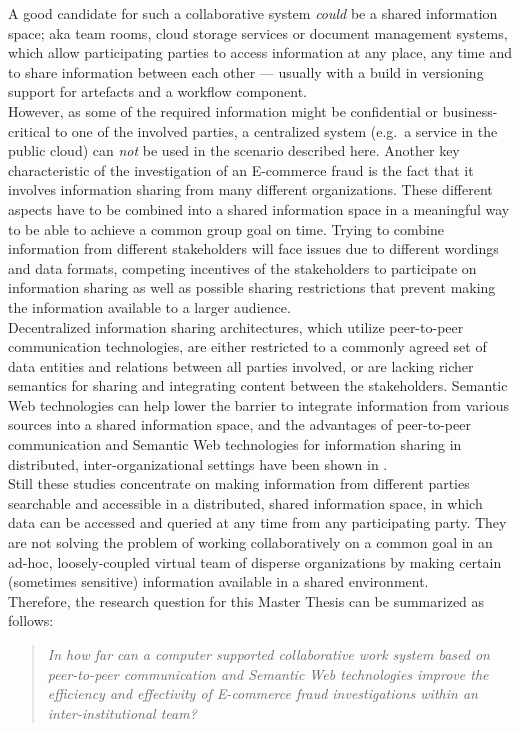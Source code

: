 A good candidate for such a collaborative system \emph{could} be a shared information space; aka team rooms, cloud storage services or document management systems, which allow participating parties to access information at any place, any time and to share information between each other --- usually with a build in versioning support for artefacts and a workflow component. \\

However, as some of the required information might be confidential or business-critical to one of the involved parties, a centralized system (e.g.\ a service in the public cloud) can \emph{not} be used in the scenario described here. Another key characteristic of the investigation of an \gls{E-commerce} fraud is the fact that it involves information sharing from many different organizations. These different aspects have to be combined into a shared information space in a meaningful way to be able to achieve a common group goal on time. Trying to combine information from different stakeholders will face issues due to different wordings and data formats, competing incentives of the stakeholders to participate on information sharing as well as possible sharing restrictions that prevent making the information available to a larger audience. \\

Decentralized information sharing architectures, which utilize peer-to-peer communication technologies, are either restricted to a commonly agreed set of data entities and relations between all parties involved, or are lacking richer semantics for sharing and integrating content between the stakeholders. Semantic Web technologies can help lower the barrier to integrate information from various sources into a shared information space, and the advantages of peer-to-peer communication and Semantic Web technologies for information sharing in distributed, inter-organizational settings have been shown in \citep{Staab2006}. \\

Still these studies concentrate on making information from different parties searchable and accessible in a distributed, shared information space, in which data can be accessed and queried at any time from any participating party. They are not solving the problem of working collaboratively on a common goal in an ad-hoc, loosely-coupled virtual team of disperse organizations by making certain (sometimes sensitive) information available in a shared environment. \\

Therefore, the research question for this Master Thesis can be summarized as follows: \@

\begin{quotation}
  \textit{In how far can a computer supported collaborative work system based on peer-to-peer communication and Semantic Web technologies improve the efficiency and effectivity of \gls{E-commerce} fraud investigations within an inter-institutional team?}
\end{quotation}

